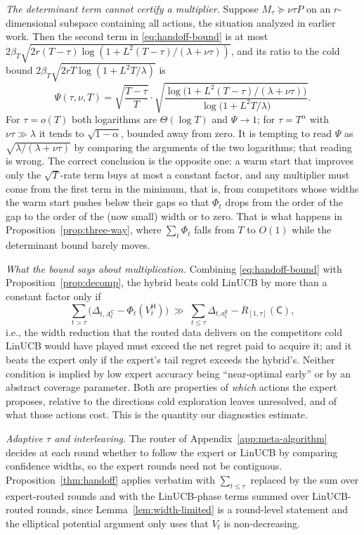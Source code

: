 \documentclass{article}
\theoremstyle{definition}
\theoremstyle{remark}
\theoremstyle{remark}
\newcommand{\Cold}{\mathsf{C}}
\newcommand{\Exp}{\mathsf{E}}
\newcommand{\Hyb}{\mathsf{H}}
\begin{document}
\emph{The determinant term cannot certify a multiplier.} Suppose
$M_\tau\succeq\nu\tau P$ on an $r$-dimensional subspace containing all actions,
the situation analyzed in earlier work. Then the second term in
\eqref{eq:handoff-bound} is at most
$2\beta_T\sqrt{2r(T-\tau)\log(1+L^2(T-\tau)/(\lambda+\nu\tau))}$, and its ratio
to the cold bound $2\beta_T\sqrt{2rT\log(1+L^2T/\lambda)}$ is
\[
\Psi(\tau,\nu,T)=\sqrt{\frac{T-\tau}{T}}\cdot\sqrt{\frac{\log\bigl(1+L^2(T-\tau)/(\lambda+\nu\tau)\bigr)}{\log\bigl(1+L^2T/\lambda\bigr)}}.
\]
For $\tau=o(T)$ both logarithms are $\Theta(\log T)$ and $\Psi\to1$; for
$\tau=T^{\alpha}$ with $\nu\tau\gg\lambda$ it tends to $\sqrt{1-\alpha}$, bounded
away from zero. It is tempting to read $\Psi$ as
$\sqrt{\lambda/(\lambda+\nu\tau)}$ by comparing the arguments of the two
logarithms; that reading is wrong. The correct conclusion is the opposite
one: a warm start that improves only the $\sqrt{T}$-rate term buys at most a
constant factor, and any multiplier must come from the first term in the
minimum, that is, from competitors whose widths the warm start pushes below
their gaps so that $\Phi_t$ drops from the order of the gap to the order of
the (now small) width or to zero. That is what happens in
Proposition~\ref{prop:three-way}, where $\sum_t\Phi_t$ falls from $T$ to $O(1)$
while the determinant bound barely moves.

\emph{What the bound says about multiplication.} Combining
\eqref{eq:handoff-bound} with Proposition~\ref{prop:decomp}, the hybrid beats
cold LinUCB by more than a constant factor only if
\[
\sum_{t>\tau}\bigl(\Delta_{t,A^{\Cold}_t}-\Phi_t(V^{\Hyb}_t)\bigr)
\;\gg\;
\sum_{t\le\tau}\Delta_{t,a_t^{\Exp}}-R_{[1,\tau]}(\Cold),
\]
i.e., the width reduction that the routed data delivers on the competitors
cold LinUCB would have played must exceed the net regret paid to acquire it;
and it beats the expert only if the expert's tail regret exceeds the hybrid's.
Neither condition is implied by low expert accuracy being ``near-optimal
early'' or by an abstract coverage parameter. Both are properties of
\emph{which} actions the expert proposes, relative to the directions cold
exploration leaves unresolved, and of what those actions cost. This is the
quantity our diagnostics estimate.

\emph{Adaptive $\tau$ and interleaving.} The router of
Appendix~\ref{app:meta-algorithm} decides at each round whether to follow the
expert or LinUCB by comparing confidence widths, so the expert rounds need not
be contiguous. Proposition~\ref{thm:handoff} applies verbatim with
$\sum_{t\le\tau}$ replaced by the sum over expert-routed rounds and with the
LinUCB-phase terms summed over LinUCB-routed rounds, since
Lemma~\ref{lem:width-limited} is a round-level statement and the elliptical
potential argument only uses that $V_t$ is non-decreasing.
\end{document}
